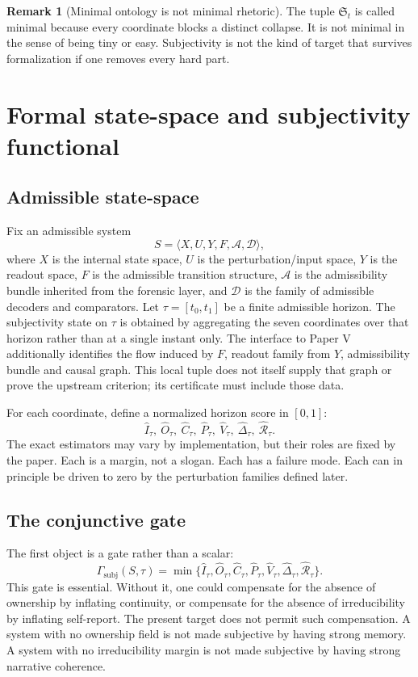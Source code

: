 \documentclass[11pt,a4paper]{article}
\theoremstyle{definition}
\newtheorem{remark}[theorem]{Remark}
\newcommand{\Substate}{\mathfrak{S}}
\newcommand{\SelfIndex}{I}
\newcommand{\OwnField}{O}
\newcommand{\ContField}{C}
\newcommand{\Persp}{P}
\newcommand{\ValAsym}{V}
\newcommand{\IntervProf}{\Delta}
\newcommand{\Irred}{\mathcal{R}}
\newcommand{\GateSubj}{\Gamma_{\mathrm{subj}}}
\begin{document}
\begin{remark}[Minimal ontology is not minimal rhetoric]
The tuple $\Substate_t$ is called minimal because every coordinate blocks a distinct collapse. It is not minimal in the sense of being tiny or easy. Subjectivity is not the kind of target that survives formalization if one removes every hard part.
\end{remark}

\section{Formal state-space and subjectivity functional}
\subsection{Admissible state-space}
Fix an admissible system
\[
S=\langle X,U,Y,F,\mathcal{A},\mathcal{D}\rangle,
\]
where $X$ is the internal state space, $U$ is the perturbation/input space, $Y$ is the readout space, $F$ is the admissible transition structure, $\mathcal{A}$ is the admissibility bundle inherited from the forensic layer, and $\mathcal{D}$ is the family of admissible decoders and comparators. Let $\tau=[t_0,t_1]$ be a finite admissible horizon. The subjectivity state on $\tau$ is obtained by aggregating the seven coordinates over that horizon rather than at a single instant only. The interface to Paper V additionally identifies the flow induced by $F$, readout family from $Y$, admissibility bundle and causal graph. This local tuple does not itself supply that graph or prove the upstream criterion; its certificate must include those data.

For each coordinate, define a normalized horizon score in $[0,1]$:
\[
\widehat{\SelfIndex}_\tau,\ \widehat{\OwnField}_\tau,\ \widehat{\ContField}_\tau,\ \widehat{\Persp}_\tau,\ \widehat{\ValAsym}_\tau,\ \widehat{\IntervProf}_\tau,\ \widehat{\Irred}_\tau.
\]
The exact estimators may vary by implementation, but their roles are fixed by the paper. Each is a margin, not a slogan. Each has a failure mode. Each can in principle be driven to zero by the perturbation families defined later.

\subsection{The conjunctive gate}
The first object is a gate rather than a scalar:
\[
\GateSubj(S,\tau)=\min\Big\{
\widehat{\SelfIndex}_\tau,
\widehat{\OwnField}_\tau,
\widehat{\ContField}_\tau,
\widehat{\Persp}_\tau,
\widehat{\ValAsym}_\tau,
\widehat{\IntervProf}_\tau,
\widehat{\Irred}_\tau
\Big\}.
\]
This gate is essential. Without it, one could compensate for the absence of ownership by inflating continuity, or compensate for the absence of irreducibility by inflating self-report. The present target does not permit such compensation. A system with no ownership field is not made subjective by having strong memory. A system with no irreducibility margin is not made subjective by having strong narrative coherence.
\end{document}
